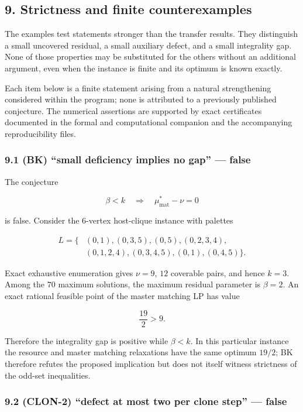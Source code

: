\documentclass[english,11pt,a4paper]{article}
\newcounter{none}
\begin{document}
\subsection{9. Strictness and finite
counterexamples}\label{strictness-and-finite-counterexamples}

The examples test statements stronger than the transfer results. They
distinguish a small uncovered residual, a small auxiliary defect, and a
small integrality gap. None of those properties may be substituted for
the others without an additional argument, even when the instance is
finite and its optimum is known exactly.

Each item below is a finite statement arising from a natural
strengthening considered within the program; none is attributed to a
previously published conjecture. The numerical assertions are supported
by exact certificates documented in the formal and computational
companion and the accompanying reproducibility files.

\subsubsection{9.1 (BK) ``small deficiency implies no gap'' ---
false}\label{bk-small-deficiency-implies-no-gap-false}

The conjecture

\[
\beta<k
\quad\Longrightarrow\quad
\mu^*_{\mathrm{mat}}-\nu=0
\]

is false. Consider the 6-vertex host-clique instance with palettes

\[
\begin{aligned}
L=\{&(0,1),(0,3,5),(0,5),(0,2,3,4),\\
    &(0,1,2,4),(0,3,4,5),(0,1),(0,4,5)\}.
\end{aligned}
\]

Exact exhaustive enumeration gives \(\nu=9\), \(12\) coverable pairs,
and hence \(k=3\). Among the \(70\) maximum solutions, the maximum
residual parameter is \(\beta=2\). An exact rational feasible point of
the master matching LP has value

\[
\frac{19}{2}>9.
\]

Therefore the integrality gap is positive while \(\beta<k\). In this
particular instance the resource and master matching relaxations have
the same optimum \(19/2\); BK therefore refutes the proposed implication
but does not itself witness strictness of the odd-set inequalities.

\subsubsection{9.2 (CLON-2) ``defect at most two per clone step'' ---
false}\label{clon-2-defect-at-most-two-per-clone-step-false}
\end{document}
